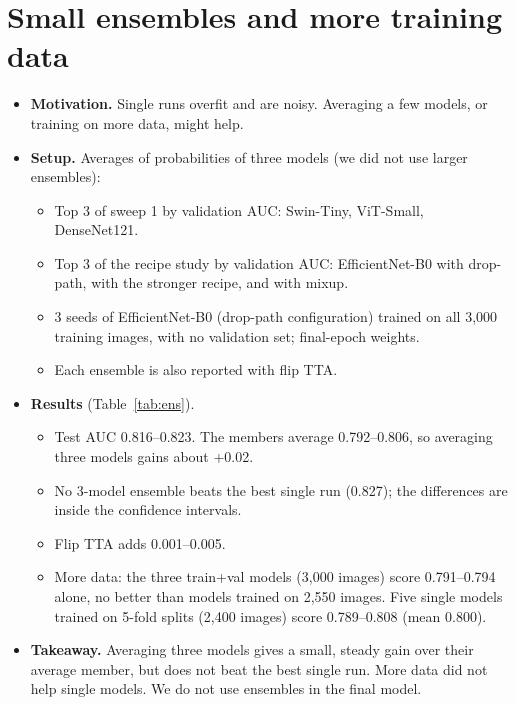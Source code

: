 \documentclass[11pt]{article}
\begin{document}
\section{Small ensembles and more training data}\label{app:ens}
\begin{itemize}
\item \textbf{Motivation.} Single runs overfit and are noisy. Averaging a few models, or training on more data, might help.
\item \textbf{Setup.} Averages of probabilities of three models (we did not use larger ensembles):
  \begin{itemize}
  \item Top 3 of sweep 1 by validation AUC: Swin-Tiny, ViT-Small, DenseNet121.
  \item Top 3 of the recipe study by validation AUC: EfficientNet-B0 with drop-path, with the stronger recipe, and with mixup.
  \item 3 seeds of EfficientNet-B0 (drop-path configuration) trained on all 3{,}000 training images, with no validation set; final-epoch weights.
  \item Each ensemble is also reported with flip TTA.
  \end{itemize}
\item \textbf{Results} (Table~\ref{tab:ens}).
  \begin{itemize}
  \item Test AUC 0.816--0.823. The members average 0.792--0.806, so averaging three models gains about +0.02.
  \item No 3-model ensemble beats the best single run (0.827); the differences are inside the confidence intervals.
  \item Flip TTA adds 0.001--0.005.
  \item More data: the three train+val models (3{,}000 images) score 0.791--0.794 alone, no better than models trained on 2{,}550 images. Five single models trained on 5-fold splits (2{,}400 images) score 0.789--0.808 (mean 0.800).
  \end{itemize}
\item \textbf{Takeaway.} Averaging three models gives a small, steady gain over their average member, but does not beat the best single run. More data did not help single models. We do not use ensembles in the final model.
\end{itemize}

\begin{table}[h]
\centering\footnotesize
\setlength{\tabcolsep}{3pt}
\resizebox{\linewidth}{!}{}
\caption{Three-model ensembles. ``Members' mean AUC'' is the average test AUC of the three members.}
\label{tab:ens}
\end{table}
\end{document}
